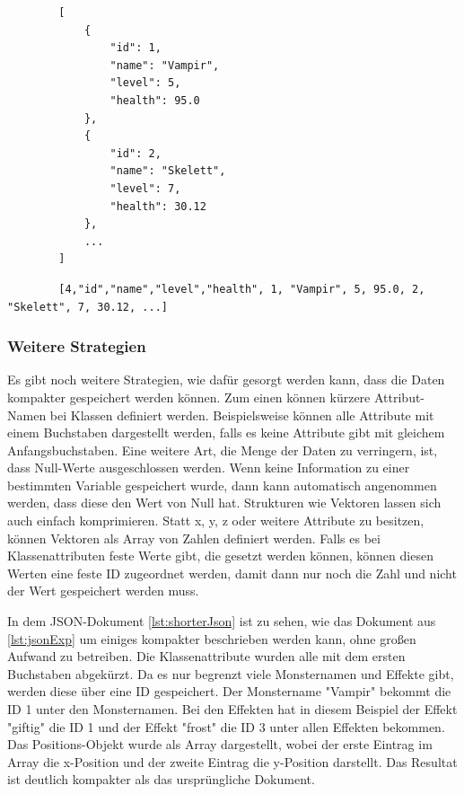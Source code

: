 \begin{listing}[htp]
    \begin{verbatim} 
        [
            {
                "id": 1,
                "name": "Vampir",
                "level": 5,
                "health": 95.0
            },
            {
                "id": 2,
                "name": "Skelett",
                "level": 7,
                "health": 30.12
            },
            ...
        ]                   
    \end{verbatim}
    \caption{}
    \label{lst:hpackJsonExp}
\end{listing}

\begin{listing}[htp]
    \begin{verbatim} 
        [4,"id","name","level","health", 1, "Vampir", 5, 95.0, 2, "Skelett", 7, 30.12, ...]                  
    \end{verbatim}
    \caption{}
    \label{lst:hpackCompressedExp}
\end{listing}

\subsubsection{Weitere Strategien}
Es gibt noch weitere Strategien, wie dafür gesorgt werden kann, dass die Daten kompakter gespeichert werden können. Zum einen können kürzere Attribut-Namen bei Klassen definiert werden. Beispielsweise können alle Attribute mit einem Buchstaben dargestellt werden, falls es keine Attribute gibt mit gleichem Anfangsbuchstaben. Eine weitere Art, die Menge der Daten zu verringern, ist, dass Null-Werte ausgeschlossen werden. Wenn keine Information zu einer bestimmten Variable gespeichert wurde, dann kann automatisch angenommen werden, dass diese den Wert von Null hat. Strukturen wie Vektoren lassen sich auch einfach komprimieren. Statt x, y, z oder weitere Attribute zu besitzen, können Vektoren als Array von Zahlen definiert werden. Falls es bei Klassenattributen feste Werte gibt, die gesetzt werden können, können diesen Werten eine feste ID zugeordnet werden, damit dann nur noch die Zahl und nicht der Wert gespeichert werden muss.\cite{objelean2011json}\cite{baeldungReducingJSON}

In dem JSON-Dokument \ref{lst:shorterJson} ist zu sehen, wie das Dokument aus \ref{lst:jsonExp} um einiges kompakter beschrieben werden kann, ohne großen Aufwand zu betreiben. Die Klassenattribute wurden alle mit dem ersten Buchstaben abgekürzt. Da es nur begrenzt viele Monsternamen und Effekte gibt, werden diese über eine ID gespeichert. Der Monstername "Vampir" bekommt die ID 1 unter den Monsternamen. Bei den Effekten hat in diesem Beispiel der Effekt "giftig" die ID 1 und der Effekt "frost" die ID 3 unter allen Effekten bekommen. Das Positions-Objekt wurde als Array dargestellt, wobei der erste Eintrag im Array die x-Position und der zweite Eintrag die y-Position darstellt. Das Resultat ist deutlich kompakter als das ursprüngliche Dokument.

